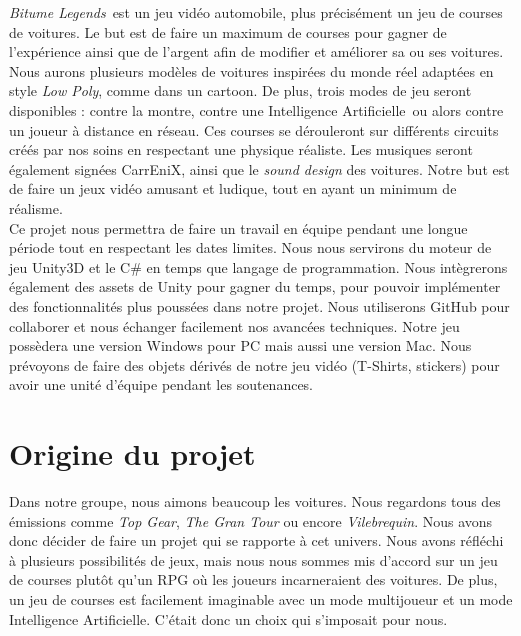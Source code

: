 \documentclass[12pt,a4paper]{article}
\newcommand{\btmlgs}{\textit{Bitume Legends}}
\newcommand{\AI}{Intelligence Artificielle}
\newcommand{\CEX}{CarrEniX}
\begin{document}
\btmlgs\, est un jeu vidéo automobile, plus précisément un jeu de courses de voitures. Le but est 
de faire un maximum de courses pour gagner de l'expérience ainsi que de l'argent afin de
modifier et améliorer sa ou ses voitures.
Nous aurons plusieurs modèles de voitures inspirées du monde réel adaptées en style \textit{Low Poly},
comme dans un cartoon. De plus, trois modes de jeu seront disponibles : contre la montre, contre une \AI\,
ou alors contre un joueur à distance en réseau. Ces courses se dérouleront sur différents circuits créés 
par nos soins en respectant une physique réaliste.
Les musiques seront également signées \CEX, ainsi que le \textit{sound design} des voitures.
Notre but est de faire un jeux vidéo amusant et ludique, tout en ayant un minimum de réalisme.\\

Ce projet nous permettra de faire un travail en équipe pendant une longue période tout en respectant les dates limites.
Nous nous servirons du moteur de jeu Unity3D et le C\# en temps que langage de programmation. Nous intègrerons 
également des assets de Unity pour gagner du temps, pour pouvoir implémenter des fonctionnalités plus poussées dans notre projet.
Nous utiliserons GitHub pour collaborer et nous échanger facilement nos avancées techniques.
Notre jeu possèdera une version Windows pour PC mais aussi une version Mac.
Nous prévoyons de faire des objets dérivés de notre jeu vidéo (T-Shirts, stickers) pour avoir une unité d'équipe 
pendant les soutenances.\\


\clearpage

\section{Origine du projet}
Dans notre groupe, nous aimons beaucoup les voitures. Nous regardons tous des émissions comme 
\textit{Top Gear}, \textit{The Gran Tour} ou encore \textit{Vilebrequin}. Nous avons donc décider de faire
un projet qui se rapporte à cet univers. Nous avons réfléchi à plusieurs possibilités de jeux, mais nous
nous sommes mis d'accord sur un jeu de courses plutôt qu'un RPG où les joueurs incarneraient des voitures.
De plus, un jeu de courses est facilement imaginable avec un mode multijoueur et un mode Intelligence 
Artificielle. C'était donc un choix qui s'imposait pour nous.\\
\end{document}
